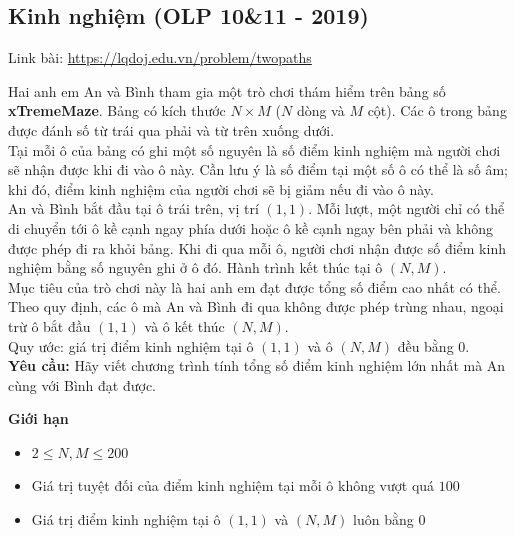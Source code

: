 \documentclass{article}
\begin{document}
\subsection{Kinh nghiệm (OLP 10\&11 - 2019)}
Link bài: \url{https://lqdoj.edu.vn/problem/twopaths}

\begin{tcolorbox}[
    colback=blue!5,        %
    colframe=blue!75!black,%
    title={Đề bài}
]

Hai anh em An và Bình tham gia một trò chơi thám hiểm trên bảng số \textbf{xTremeMaze}.  
Bảng có kích thước $N \times M$ ($N$ dòng và $M$ cột). Các ô trong bảng được đánh số từ trái qua phải và từ trên xuống dưới.\\

Tại mỗi ô của bảng có ghi một số nguyên là số điểm kinh nghiệm mà người chơi sẽ nhận được khi đi vào ô này.  
Cần lưu ý là số điểm tại một số ô có thể là số âm; khi đó, điểm kinh nghiệm của người chơi sẽ bị giảm nếu đi vào ô này.\\

An và Bình bắt đầu tại ô trái trên, vị trí $(1,1)$.  
Mỗi lượt, một người chỉ có thể di chuyển tới ô kề cạnh ngay phía dưới hoặc ô kề cạnh ngay bên phải và không được phép đi ra khỏi bảng.  
Khi đi qua mỗi ô, người chơi nhận được số điểm kinh nghiệm bằng số nguyên ghi ở ô đó.  
Hành trình kết thúc tại ô $(N,M)$.\\

Mục tiêu của trò chơi này là hai anh em đạt được tổng số điểm cao nhất có thể.  
Theo quy định, các ô mà An và Bình đi qua không được phép trùng nhau, ngoại trừ ô bắt đầu $(1,1)$ và ô kết thúc $(N,M)$. \\

Quy ước: giá trị điểm kinh nghiệm tại ô $(1,1)$ và ô $(N,M)$ đều bằng $0$.\\

\textbf{Yêu cầu:} Hãy viết chương trình tính tổng số điểm kinh nghiệm lớn nhất mà An cùng với Bình đạt được.

\end{tcolorbox}

\textbf{Giới hạn}

\begin{itemize}
    \item $2 \leq N, M \leq 200$
    \item Giá trị tuyệt đối của điểm kinh nghiệm tại mỗi ô không vượt quá $100$
    \item Giá trị điểm kinh nghiệm tại ô $(1,1)$ và $(N,M)$ luôn bằng $0$
\end{itemize}
\end{document}
